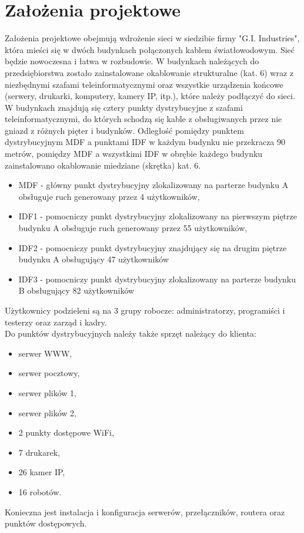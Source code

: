 \documentclass[12pt,a4paper,titlepage]{article}
\begin{document}
\section{Założenia projektowe}
Założenia projektowe obejmują wdrożenie sieci w siedzibie firmy "G.I. Industries", która mieści się w dwóch budynkach połączonych kablem światłowodowym. Sieć będzie nowoczesna i łatwa w rozbudowie. W budynkach należących do przedsiębiorstwa zostało zainstalowane okablowanie strukturalne (kat.  6) wraz z niezbędnymi szafami teleinformatycznymi oraz wszystkie  urządzenia  końcowe (serwery,  drukarki, komputery,  kamery  IP,  itp.), które należy podłączyć do sieci.
W budynkach znajdują się cztery punkty dystrybucyjne z szafami teleinformatycznymi, do których schodzą się kable z obsługiwanych przez nie gniazd z różnych pięter i budynków. Odległość pomiędzy punktem dystrybucyjnym MDF a punktami IDF w każdym budynku nie przekracza 90 metrów,  pomiędzy  MDF  a  wszystkimi  IDF  w  obrębie  każdego  budynku  zainstalowano  okablowanie miedziane (skrętka) kat. 6.
\begin{itemize}
    \item MDF - główny punkt dystrybucyjny zlokalizowany na parterze budynku A obsługuje ruch generowany przez 4 użytkowników,
    \item IDF1 - pomocniczy punkt dystrybucyjny zlokalizowany na pierwszym piętrze budynku A obsługuje ruch generowany przez 55 użytkowników,
    \item IDF2 - pomocniczy punkt dystrybucyjny znajdujący się na drugim piętrze budynku A obsługujący 47 użytkowników
    \item IDF3 - pomocniczy punkt dystrybucyjny zlokalizowany na parterze budynku B obsługujący 82 użytkowników
\end{itemize}
Użytkownicy podzieleni są na 3 grupy robocze: administratorzy, programiści i testerzy oraz zarząd i kadry.\bigskip\\
Do punktów dystrybucyjnych należy także sprzęt należący do klienta:
\begin{itemize}
    \item serwer WWW,
    \item serwer pocztowy,
    \item serwer plików 1,
    \item serwer plików 2,
    \item 2 punkty dostępowe WiFi,
    \item 7 drukarek,
    \item 26 kamer IP,
    \item 16 robotów.
\end{itemize}
Konieczna jest instalacja i konfiguracja serwerów, przełączników, routera oraz punktów dostępowych.
\end{document}
